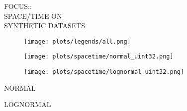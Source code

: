 \documentclass{article}
\begin{document}
\begin{figure}[!htbp]
\fbox
{
\begin{minipage}[t][0.98\textheight][t]{\textwidth}
\centering
    \begin{minipage}{0.23\linewidth}
    \footnotesize{FOCUS::\\ SPACE/TIME ON \\ SYNTHETIC DATASETS}
    \end{minipage}
   \begin{minipage}{0.75\linewidth}
        \begin{figure}[H]
        \texttt{[image: plots/legends/all.png]}
        \end{figure}
    \end{minipage}
    \vfill

   \begin{minipage}{0.48\linewidth}
        \begin{figure}[H]
        \texttt{[image: plots/spacetime/normal\_uint32.png]}
        \end{figure}
    \end{minipage}
    \begin{minipage}{0.48\linewidth}
        \begin{figure}[H]
        \texttt{[image: plots/spacetime/lognormal\_uint32.png]} 
        \end{figure}
    \end{minipage}
    \begin{minipage}{0.48\linewidth}
    \begin{center}
        NORMAL
    \end{center}
    \end{minipage}
    \begin{minipage}{0.48\linewidth}
    \begin{center}
        LOGNORMAL
    \end{center}
    \end{minipage}

    \vfill


\end{minipage}}
\end{figure}
\end{document}
